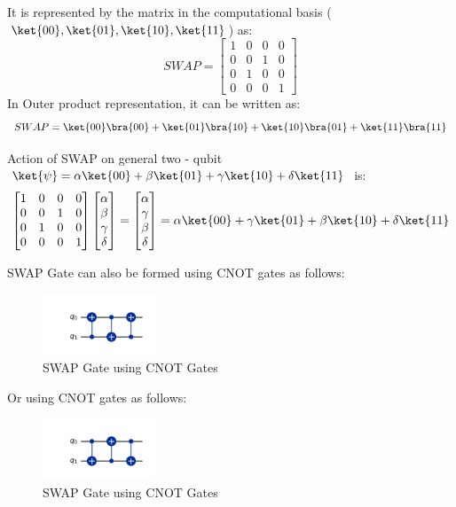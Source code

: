 \documentclass[12pt, oneside]{book}
\theoremstyle{definition}
\theoremstyle{definition}
\theoremstyle{remark}
\begin{document}
It is represented by the matrix in the computational basis ($\ket{00},\ket{01},\ket{10},\ket{11}$) as:
\[
    SWAP=\begin{bmatrix}
        1 & 0 & 0 & 0 \\
        0 & 0 & 1 & 0 \\
        0 & 1 & 0 & 0 \\
        0 & 0 & 0 & 1
    \end{bmatrix}
\]
In Outer product representation, it can be written as:
\[
    SWAP=\ket{00}\bra{00}+\ket{01}\bra{10}+\ket{10}\bra{01}+\ket{11}\bra{11}
\]

Action of SWAP on general two - qubit $\ket{\psi} = \alpha\ket{00}+\beta\ket{01}+\gamma\ket{10}+\delta\ket{11}$ is:
\[
    \begin{bmatrix} 
        1 & 0 & 0 & 0 \\
        0 & 0 & 1 & 0 \\
        0 & 1 & 0 & 0 \\
        0 & 0 & 0 & 1
    \end{bmatrix}\begin{bmatrix}
        \alpha \\
        \beta \\
        \gamma \\
        \delta
    \end{bmatrix}=\begin{bmatrix}
        \alpha \\
        \gamma \\
        \beta \\
        \delta
    \end{bmatrix}=\alpha\ket{00}+\gamma\ket{01}+\beta\ket{10}+\delta\ket{11}
\]

SWAP Gate can also be formed using CNOT gates as follows:
\begin{figure}[H]
    \centering
    \includegraphics[width=0.3\textwidth]{../images/swap-gatemeth1.png}
    \caption{SWAP Gate using CNOT Gates}
    \label{fig:swap-cnot1}
\end{figure}
Or using CNOT gates as follows:
\begin{figure}[H]
    \centering
    \includegraphics[width=0.3\textwidth]{../images/swap-gatemeth2.png}
    \caption{SWAP Gate using CNOT Gates}
    \label{fig:swap-cnot2}
\end{figure}
\end{document}
